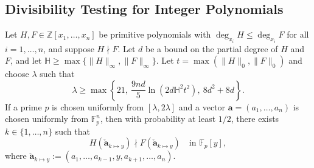 \documentclass{article}
\numberwithin{equation}{section}
\begin{document}
\subsection*{Divisibility Testing for Integer Polynomials}\label{subsec:int-divisibility}

\begin{theorem}\label{thm:int-divisibility}
Let $H, F \in \mathbb{Z}[x_1, \dots, x_n]$ be primitive polynomials with $\deg_{x_i} H \le \deg_{x_i} F$ for all $i=1,\dots,n$, and suppose $H \nmid F$. Let $d$ be a bound on the partial degree of $H$ and $F$, and let $\mathbb{H} \ge \max\{\|H\|_\infty, \|F\|_\infty\}$. Let $t = \max(\|H\|_0, \|F\|_0)$ and choose $\lambda$ such that
\[
\lambda \ge \max\left\{
    21,\ 
    \frac{9 n d}{5} \ln(2 d \mathbb{H}^2 t^2),\ 
    8  d^2 + 8  d
\right\}.
\]
If a prime $p$ is chosen uniformly from $[\lambda, 2\lambda]$ and a vector $\mathbf{a} = (a_1, \dots, a_n)$ is chosen uniformly from $\mathbb{F}_p^n$, then with probability at least $1/2$, there exists $k \in \{1,\dots,n\}$ such that
\[
H(\mathbf{\check{a}}_{k \mapsto y} ) \nmid F(\mathbf{\check{a}}_{k \mapsto y} ) \quad \text{in } \mathbb{F}_p[y],
\]
where $\mathbf{\check{a}}_{k \mapsto y}  := (a_1, \dots, a_{k-1}, y, a_{k+1}, \dots, a_n)$.
\end{theorem}
\end{document}
